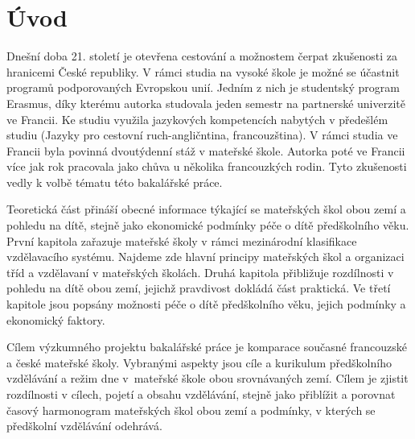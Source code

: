 \chapter{Úvod}

Dnešní doba 21. století je otevřena cestování a možnostem čerpat zkušenosti za hranicemi České republiky. V rámci studia na vysoké škole je možné se účastnit programů podporovaných Evropskou unií. Jedním z nich je studentský program Erasmus, díky kterému autorka studovala jeden semestr na partnerské univerzitě ve Francii. Ke studiu využila jazykových kompetencích nabytých v předešlém studiu (Jazyky pro cestovní ruch-angličntina, francouzština). V rámci studia ve Francii byla povinná dvoutýdenní stáž v mateřské škole. Autorka poté ve Francii více jak rok pracovala jako chůva u několika francouzkých rodin. Tyto zkušenosti vedly k volbě tématu této bakalářské práce. 

Teoretická část přináší obecné informace týkající se mateřských škol obou zemí a pohledu na dítě, stejně jako ekonomické podmínky péče o dítě předškolního věku. První kapitola zařazuje mateřské školy v rámci mezinárodní klasifikace vzdělavacího systému. Najdeme zde hlavní principy mateřských škol a organizaci tříd a vzdělavaní v mateřských školách. Druhá kapitola přibližuje rozdílnosti v pohledu na dítě obou zemí, jejichž pravdivost dokládá část praktická. Ve třetí kapitole jsou popsány možnosti péče o dítě předškolního věku, jejich podmínky a ekonomický faktory. 

Cílem výzkumného projektu bakalářské práce je komparace současné francouzské a české mateřské školy. Vybranými aspekty jsou cíle a kurikulum předškolního vzdělávání a režim dne v mateřské škole obou srovnávaných zemí. Cílem je zjistit rozdílnosti v cílech, pojetí a obsahu vzdělávání, stejně jako přiblížit a porovnat časový harmonogram mateřských škol obou zemí a podmínky, v kterých se předškolní vzdělávání odehrává. 

